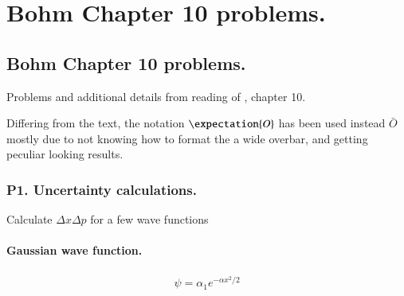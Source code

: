 
%
%




\chapter{Bohm Chapter 10 problems. }
\label{chap:bohmCh10}
\date{ April 23, 2009.  bohmCh10.tex }

%

\section{Bohm Chapter 10 problems. }

Problems and additional details from reading of \citep{bohm1989qt}, chapter 10.

Differing from the text, the notation $\expectation{O}$ has been used instead $\bar{O}$ mostly due to not knowing how to format the a wide overbar, and getting peculiar looking results.

\subsection{P1. Uncertainty calculations. }

Calculate $\Delta x \Delta p$ for a few wave functions

\subsubsection{Gaussian wave function. }

\begin{align*}
\psi = \alpha_1 e^{-\alpha x^2/2}
\end{align*}


